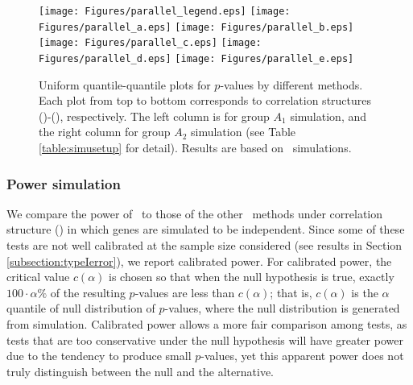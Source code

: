 	
	\begin{figure}[!ht]
		\begin{center}
			\texttt{[image: Figures/parallel\_legend.eps]}
			\texttt{[image: Figures/parallel\_a.eps]}
			\texttt{[image: Figures/parallel\_b.eps]}
			\texttt{[image: Figures/parallel\_c.eps]}
			\texttt{[image: Figures/parallel\_d.eps]}
			\texttt{[image: Figures/parallel\_e.eps]}
		\end{center} 
		\caption[Uniform quantile-quantile plots for $p$-values by different methods]{Uniform 
		quantile-quantile plots for $p$-values by different methods. Each plot 
		from top to
			bottom corresponds to correlation structures (\aaCase)-(\fCase), respectively. The left 
			column is
			for group $A_1$ simulation, and the right column for group $A_2$ simulation (see Table
			\ref{table:simusetup} for detail). Results are based on
			\HowmanySimu~simulations.}\label{fig:typeIerror}
	\end{figure} 
	
	
	\subsubsection{Power simulation}\label{subsection:power}		 
	
	
	
	We compare the power of \OurMethod~to those of the other \HowmanyTest~methods under correlation 
	structure (\aaCase)
	in which genes are simulated to be independent. 
	Since some of these tests are not well calibrated at the sample size
	considered (see results in Section \ref{subsection:typeIerror}), we report calibrated power. For
	calibrated power, the critical value $c(\alpha)$ is chosen so that when the null hypothesis is 
	true,
	exactly $100\cdot\alpha\%$ of the resulting $p$-values are less than $c(\alpha)$; that is,
	$c(\alpha)$ is  the $\alpha$ quantile of null distribution of $p$-values, where the null
	distribution is generated from simulation. Calibrated power allows a more fair comparison among
	tests, as tests that are too conservative under the null hypothesis will have greater power due 
	to
	the tendency to produce small $p$-values, yet this apparent power does not truly distinguish 
	between
	the null and the alternative.  
	
